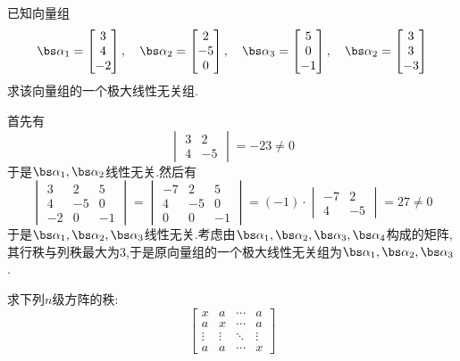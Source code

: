 \documentclass{ctexart}
\begin{document}
\begin{homework}[5(10')]
    已知向量组
    \[\bs\alpha_1=\begin{bmatrix}
        3\\4\\-2
    \end{bmatrix},\quad\bs\alpha_2=\begin{bmatrix}
        2\\-5\\0
    \end{bmatrix},\quad\bs\alpha_3=\begin{bmatrix}
        5\\0\\-1
    \end{bmatrix},\quad\bs\alpha_2=\begin{bmatrix}
        3\\3\\-3
    \end{bmatrix}\]
    求该向量组的一个极大线性无关组.
\end{homework}
\begin{solution}
    首先有
    \[\begin{vmatrix}
        3&2\\4&-5
    \end{vmatrix}=-23\neq0\]
    于是$\bs\alpha_1,\bs\alpha_2$线性无关.然后有
    \[\begin{vmatrix}
        3&2&5\\4&-5&0\\-2&0&-1
    \end{vmatrix}=\begin{vmatrix}
        -7&2&5\\4&-5&0\\0&0&-1
    \end{vmatrix}=(-1)\cdot\begin{vmatrix}
        -7&2\\4&-5
    \end{vmatrix}=27\neq0\]
    于是$\bs\alpha_1,\bs\alpha_2,\bs\alpha_3$线性无关.考虑由$\bs\alpha_1,\bs\alpha_2,\bs\alpha_3,\bs\alpha_4$构成的矩阵,其行秩与列秩最大为$3$,于是原向量组的一个极大线性无关组为$\bs\alpha_1,\bs\alpha_2,\bs\alpha_3$.
\end{solution}
\begin{homework}[6(12')]
    求下列$n$级方阵的秩:
    \[\begin{bmatrix}
        x&a&\cdots&a\\
        a&x&\cdots&a\\
        \vdots&\vdots&\ddots&\vdots\\
        a&a&\cdots&x
    \end{bmatrix}\]
\end{homework}
\end{document}
